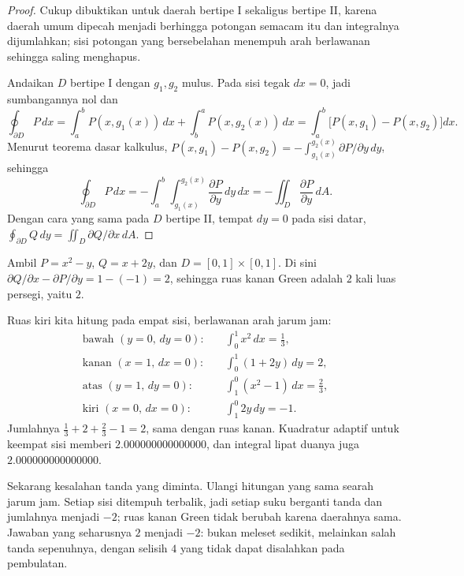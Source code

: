 \begin{proof}
Cukup dibuktikan untuk daerah bertipe I sekaligus bertipe II, karena daerah
umum dipecah menjadi berhingga potongan semacam itu dan integralnya
dijumlahkan; sisi potongan yang bersebelahan menempuh arah berlawanan sehingga
saling menghapus.

Andaikan $D$ bertipe I dengan $g_{1},g_{2}$ mulus. Pada sisi tegak $dx=0$,
jadi sumbangannya nol dan
\[
\oint_{\partial D}P\,dx=\int_{a}^{b}P(x,g_{1}(x))\,dx+\int_{b}^{a}P(x,g_{2}(x))\,dx
=\int_{a}^{b}\bigl[P(x,g_{1})-P(x,g_{2})\bigr]dx .
\]
Menurut teorema dasar kalkulus,
$P(x,g_{1})-P(x,g_{2})=-\int_{g_{1}(x)}^{g_{2}(x)}\partial P/\partial y\,dy$,
sehingga
\[
\oint_{\partial D}P\,dx=-\int_{a}^{b}\!\!\int_{g_{1}(x)}^{g_{2}(x)}
\frac{\partial P}{\partial y}\,dy\,dx=-\iint_{D}\frac{\partial P}{\partial y}\,dA .
\]
Dengan cara yang sama pada $D$ bertipe II, tempat $dy=0$ pada sisi datar,
$\oint_{\partial D}Q\,dy=\iint_{D}\partial Q/\partial x\,dA$.
\end{proof}

\begin{contoh}
Ambil $P=x^{2}-y$, $Q=x+2y$, dan $D=[0,1]\times[0,1]$. Di sini $\partial
Q/\partial x-\partial P/\partial y=1-(-1)=2$, sehingga ruas kanan Green adalah
$2$ kali luas persegi, yaitu $2$.

Ruas kiri kita hitung pada empat sisi, berlawanan arah jarum jam:
\begin{align*}
\text{bawah }(y=0,\,dy=0):&\quad \int_{0}^{1}x^{2}\,dx=\tfrac13 ,\\
\text{kanan }(x=1,\,dx=0):&\quad \int_{0}^{1}(1+2y)\,dy=2 ,\\
\text{atas }(y=1,\,dy=0):&\quad \int_{1}^{0}(x^{2}-1)\,dx=\tfrac23 ,\\
\text{kiri }(x=0,\,dx=0):&\quad \int_{1}^{0}2y\,dy=-1 .
\end{align*}
Jumlahnya $\tfrac13+2+\tfrac23-1=2$, sama dengan ruas kanan. Kuadratur adaptif
untuk keempat sisi memberi $2.000000000000000$, dan integral lipat duanya juga
$2.000000000000000$.
\end{contoh}

Sekarang kesalahan tanda yang diminta. Ulangi hitungan yang sama searah jarum
jam. Setiap sisi ditempuh terbalik, jadi setiap suku berganti tanda dan
jumlahnya menjadi $-2$; ruas kanan Green tidak berubah karena daerahnya sama.
Jawaban yang seharusnya $2$ menjadi $-2$: bukan meleset sedikit, melainkan salah
tanda sepenuhnya, dengan selisih $4$ yang tidak dapat disalahkan pada
pembulatan.

